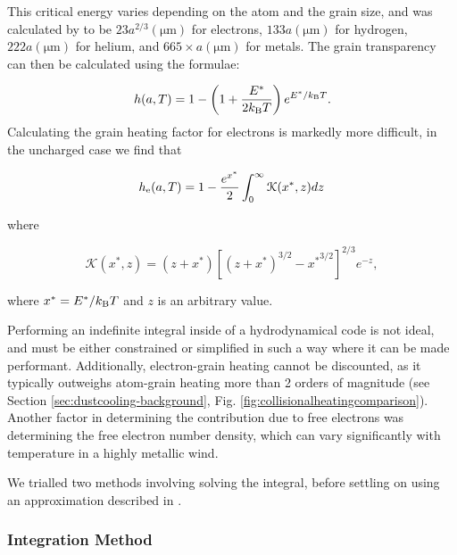 
This critical energy varies depending on the atom and the grain size, and was calculated by \textcite{dwek_infrared_1981} to be 
$23 a^{2/3} (\si{\micro\metre})$ for electrons,
$133a(\si{\micro\metre})$ for hydrogen,
$222a(\si{\micro\metre})$ for helium,
and $665\times a(\si{\micro\metre})$ for metals.
The grain transparency can then be calculated using the formulae:

\begin{equation}
  h(a,T) = 1 - \left(1 + \frac{E^*}{2k_\text{B} T}\right) e^{E^*/k_\text{B}T} .
\end{equation}
\noindent
Calculating the grain heating factor for electrons is markedly more difficult, in the uncharged case we find that

\begin{equation}
  \label{eq:heintegral}
  h_\text{e}(a,T) = 1 - \frac{e^{x^*}}{2} \int^\infty_0 \mathcal{K}(x^*,z) dz 
\end{equation}

\noindent
where

\begin{equation}
  \mathcal{K}(x^*,z) = (z + x^*) \left[ (z + x^*)^{3/2} - {x^*}^{3/2} \right]^{2/3} e^{-z} , 
\end{equation}

\noindent
where $x^* = E^* / k_\text{B} T$ and $z$ is an arbitrary value.

Performing an indefinite integral inside of a hydrodynamical code is not ideal, and must be either constrained or simplified in such a way where it can be made performant.
Additionally, electron-grain heating cannot be discounted, as it typically outweighs atom-grain heating more than 2 orders of magnitude (see Section \ref{sec:dustcooling-background}, Fig. \ref{fig:collisionalheatingcomparison}).
Another factor in determining the contribution due to free electrons was determining the free electron number density, which can vary significantly with temperature in a highly metallic wind.

We trialled two methods involving solving the integral, before settling on using an approximation described in \textcite{dwek_infrared_1981}.

\subsubsection{Integration Method}

